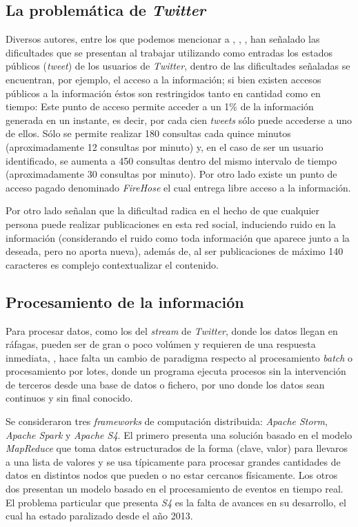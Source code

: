 \subsection{La problemática de \textit{Twitter}}
\label{intro:ea:probTwitter}

Diversos autores, entre los que podemos mencionar a \cite{VanDeVoort}, \cite{EventDetectionInTwitter}, \cite{Maldonado}, han señalado las dificultades que se presentan al trabajar utilizando como entradas los estados públicos (\textit{tweet}) de los usuarios de \textit{Twitter}, dentro de las dificultades señaladas se encuentran, por ejemplo, el acceso a la información; si bien existen accesos públicos a la información éstos son restringidos tanto en cantidad como en tiempo: Este punto de acceso permite acceder a un 1\% de la información generada en un instante, es decir, por cada cien \textit{tweets} sólo puede accederse a uno de ellos. Sólo se permite realizar 180 consultas cada quince minutos (aproximadamente 12 consultas por minuto) y, en el caso de ser un usuario identificado, se aumenta a 450 consultas dentro del mismo intervalo de tiempo (aproximadamente 30 consultas por minuto). Por otro lado existe un punto de acceso pagado denominado \textit{FireHose} el cual entrega libre acceso a la información.

Por otro lado \cite{VanDeVoort} señalan que la dificultad radica en el hecho de que cualquier persona puede realizar publicaciones en esta red social, induciendo ruido en la información (considerando el ruido como toda información que aparece junto a la deseada, pero no aporta nueva), además de, al ser publicaciones de máximo 140 caracteres es complejo contextualizar el contenido.

\subsection{Procesamiento de la información}
\label{intro:ea:procesamiento}

Para procesar datos, como los del \textit{stream} de \textit{Twitter}, donde los datos llegan en ráfagas, pueden ser de gran o poco volúmen y requieren de una respuesta inmediata, \cite{HarwoodPeter}, hace falta un cambio de paradigma respecto al procesamiento \textit{batch} o procesamiento por lotes, donde un programa ejecuta procesos sin la intervención de terceros desde una base de datos o fichero, por uno donde los datos sean continuos y sin final conocido.
 
Se consideraron tres \textit{frameworks} de computación distribuida: \textit{Apache Storm}, \textit{Apache Spark} y \textit{Apache S4}. El primero presenta una solución basado en el modelo \textit{MapReduce} que toma datos estructurados de la forma (clave, valor) para llevaros a una lista de valores y se usa típicamente para procesar grandes cantidades de datos en distintos nodos que pueden o no estar cercanos físicamente. Los otros dos presentan un modelo basado en el procesamiento de eventos en tiempo real. El problema particular que presenta \textit{S4} es la falta de avances en su desarrollo, el cual ha estado paralizado desde el año 2013. 

